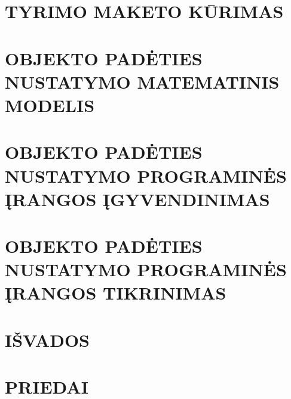 \documentclass[]{vgtuef}
\begin{document}
  

  

  \section{TYRIMO MAKETO KŪRIMAS}

  

  \section{OBJEKTO PADĖTIES NUSTATYMO MATEMATINIS MODELIS}

  

  \section{OBJEKTO PADĖTIES NUSTATYMO PROGRAMINĖS ĮRANGOS ĮGYVENDINIMAS}

  

  \section{OBJEKTO PADĖTIES NUSTATYMO PROGRAMINĖS ĮRANGOS TIKRINIMAS}

  

  \cleardoublepage

  \section*{IŠVADOS}

  

  \cleardoublepage


  
  

  \cleardoublepage
  
  \section*{PRIEDAI}

  
\end{document}
